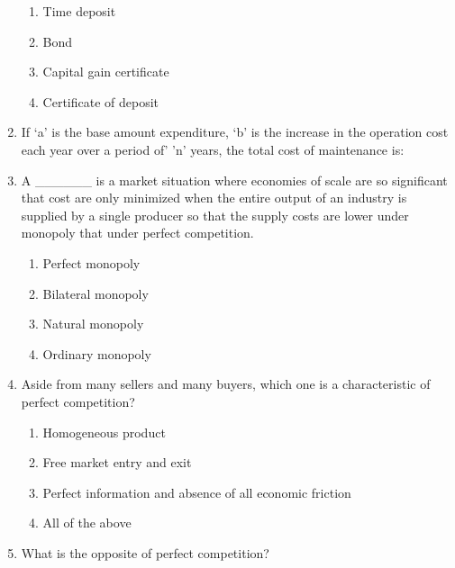 \documentclass[11pt,a4paper]{article}
\begin{document}
\begin{enumerate}
\begin{enumerate}[label=\Alph*.]
\item{Time deposit}
\item{Bond}
\item{Capital gain certificate}
\item{Certificate of deposit}
\end{enumerate}
\item{If `a' is the base amount expenditure, `b' is the increase in the operation cost each year over a period of' 'n' years, the total cost of maintenance is:
}
\\
\item{A \_\_\_\_\_\_ is a market situation where economies of scale are so significant that cost are only minimized when the entire output of an industry is supplied by a single producer so that the supply costs are lower under monopoly that under perfect competition.}
\begin{enumerate}[label=\Alph*.]
\item{Perfect monopoly}
\item{Bilateral monopoly}
\item{Natural monopoly}
\item{Ordinary monopoly}
\end{enumerate}
\item{Aside from many sellers and many buyers, which one is a characteristic of perfect competition?}
\begin{enumerate}[label=\Alph*.]
\item{Homogeneous product}
\item{Free market entry and exit}
\item{Perfect information and absence of all economic friction}
\item{All of the above}
\end{enumerate}
\item{What is the opposite of perfect competition?}
\\
\end{enumerate}
\end{document}
